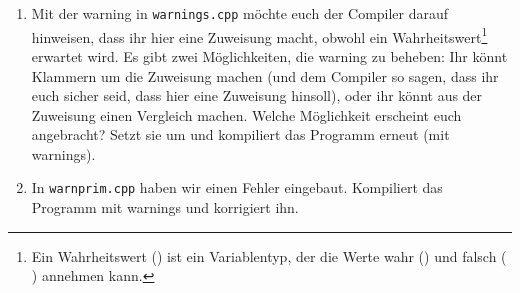 \begin{praxis}
	\begin{enumerate}[resume]
		\item Mit der warning in \texttt{warnings.cpp} möchte euch der Compiler
		      darauf hinweisen, dass ihr hier eine Zuweisung macht, obwohl ein
		      Wahrheitswert\footnote{Ein Wahrheitswert () ist ein
			      Variablentyp, der die Werte wahr () und falsch (
			      ) annehmen kann.}
		      erwartet wird. Es gibt zwei Möglichkeiten, die warning zu
		      beheben: Ihr könnt Klammern um die Zuweisung machen (und dem Compiler
		      so sagen, dass ihr euch sicher seid, dass hier eine Zuweisung hinsoll),
		      oder ihr könnt aus der Zuweisung einen Vergleich machen. Welche
		      Möglichkeit erscheint euch angebracht? Setzt sie um und kompiliert das
		      Programm erneut (mit warnings).
		\item In \texttt{warnprim.cpp} haben wir einen Fehler eingebaut. Kompiliert
		      das Programm mit warnings und korrigiert ihn.
	\end{enumerate}


\end{praxis}